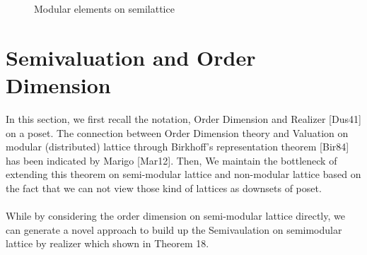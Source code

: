 \documentclass{article}
\begin{document}
\begin{figure}
\center
{}
\caption{Modular elements on semilattice} 
\label{fig:sit}
\end{figure}

\section{Semivaluation and Order Dimension}
In this section, we first recall the notation, Order Dimension and Realizer [Dus41] on a poset. The connection between Order Dimension theory and Valuation on modular (distributed) lattice through Birkhoff's representation theorem [Bir84] has been indicated by Marigo [Mar12]. Then, We maintain the bottleneck of extending this theorem on semi-modular lattice and non-modular lattice based on the fact that we can not view those kind of lattices as downsets of poset. \\\\While by considering the order dimension on semi-modular lattice directly, we can generate a novel approach to build up the Semivaulation on semimodular lattice by realizer which shown in Theorem 18.
\end{document}
